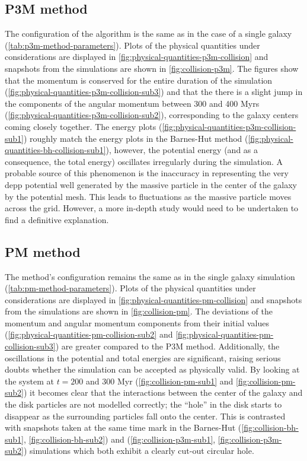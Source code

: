 \subsection{P3M method}
The configuration of the algorithm is the same as in the case of a single galaxy (\autoref{tab:p3m-method-parameters}).
Plots of the physical quantities under considerations are displayed in \autoref{fig:physical-quantities-p3m-collision} and snapshots from the simulations are shown in \autoref{fig:collision-p3m}.
The figures show that the momentum is conserved for the entire duration of the simulation (\autoref{fig:physical-quantities-p3m-collision-sub3}) and that the there is a slight jump in the components of the angular momentum between 300 and 400 Myrs (\autoref{fig:physical-quantities-p3m-collision-sub2}), corresponding to the galaxy centers coming closely together.
The energy plots (\autoref{fig:physical-quantities-p3m-collision-sub1}) roughly match the energy plots in the Barnes-Hut method (\autoref{fig:physical-quantities-bh-collision-sub1}), however, the potential energy (and as a consequence, the total energy) oscillates irregularly during the simulation.
A probable source of this phenomenon is the inaccuracy in representing the very depp potential well generated by the massive particle in the center of the galaxy by the potential mesh.
This leads to fluctuations as the massive particle moves across the grid.
However, a more in-depth study would need to be undertaken to find a definitive explanation.

\subsection{PM method}
The method's configuration remains the same as in the single galaxy simulation (\autoref{tab:pm-method-parameters}).
Plots of the physical quantities under considerations are displayed in \autoref{fig:physical-quantities-pm-collision} and snapshots from the simulations are shown in \autoref{fig:collision-pm}.
The deviations of the momentum and angular momentum components from their initial values (\autoref{fig:physical-quantities-pm-collision-sub2} and \autoref{fig:physical-quantities-pm-collision-sub3}) are greater compared to the P3M method.
Additionally, the oscillations in the potential and total energies are significant, raising serious doubts whether the simulation can be accepted as physically valid.
By looking at the system at $t=200$ and 300 Myr (\autoref{fig:collision-pm-sub1} and \autoref{fig:collision-pm-sub2}) it becomes clear that the interactions between the center of the galaxy and the disk particles are not modelled correctly;
the ``hole'' in the disk starts to disappear as the surrounding particles fall onto the center.
This is contrasted with snapshots taken at the same time mark in the Barnes-Hut (\autoref{fig:collision-bh-sub1}, \autoref{fig:collision-bh-sub2}) and \PThreeM{} (\autoref{fig:collision-p3m-sub1}, \autoref{fig:collision-p3m-sub2}) simulations which both exhibit a clearly cut-out circular hole.